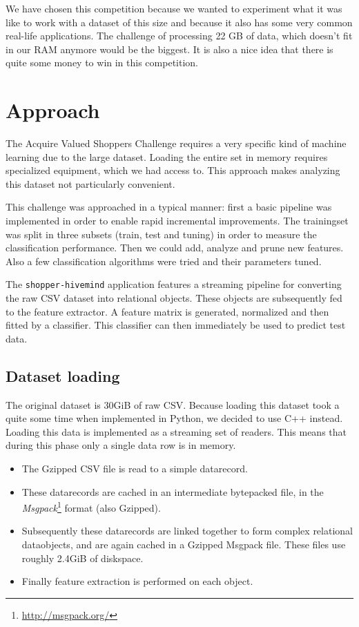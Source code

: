 \documentclass[a4paper]{article}
\begin{document}
We have chosen this competition because we wanted to experiment what it was like to work with a dataset of this size and because it also has some very common real-life applications. The challenge of processing 22 GB of data, which doesn't fit in our RAM anymore would be the biggest. It is also a nice idea that there is quite some money to win in this competition.

\section{Approach}

The Acquire Valued Shoppers Challenge requires a very specific kind of machine
learning due to the large dataset. Loading the entire set in memory requires
specialized equipment, which we had access to. This approach makes analyzing 
this dataset not particularly convenient.

This challenge was approached in a typical manner: first a basic pipeline was
implemented in order to enable rapid incremental improvements. The trainingset
was split in three subsets (train, test and tuning) in order to measure the
classification performance. Then we could add, analyze and prune new features.
Also a few classification algorithms were tried and their parameters tuned.

The \texttt{shopper-hivemind} application features a streaming pipeline for
converting the raw CSV dataset into relational objects. These objects are
subsequently fed to the feature extractor. A feature matrix is generated,
normalized and then fitted by a classifier. This classifier can then immediately
be used to predict test data.

\subsection{Dataset loading}

The original dataset is 30GiB of raw CSV. Because loading this dataset took a
quite some time when implemented in Python, we decided to use C++ instead.
Loading this data is implemented as a streaming set of readers. This means that
during this phase only a single data row is in memory.

\begin{itemize}
    \item The Gzipped CSV file is read to a simple datarecord.
    \item These datarecords are cached in an intermediate bytepacked file, in the
        \emph{Msgpack}\footnote{\url{http://msgpack.org/}} format (also Gzipped).
    \item Subsequently these datarecords are linked together to form complex
        relational dataobjects, and are again cached in a Gzipped Msgpack file.
        These files use roughly 2.4GiB of diskspace.
    \item Finally feature extraction is performed on each object.
\end{itemize}
\end{document}
